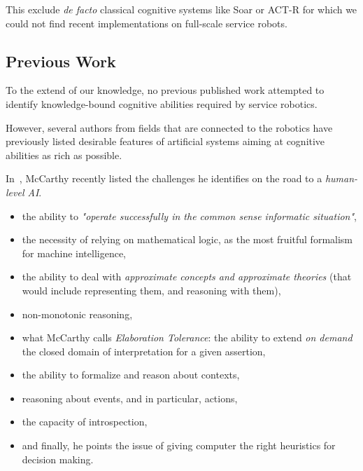 \documentclass[a4paper, twocolumn]{article}
\begin{document}
This exclude \textit{de facto} classical cognitive systems like {\sc Soar} or
{\sc ACT-R} for which we could not find recent implementations on full-scale
service robots.

\subsection{Previous Work}
\label{sect|evaluation-literature}

To the extend of our knowledge, no previous published work attempted to identify
knowledge-bound cognitive abilities required by service robotics.

However, several authors from fields that are connected to the robotics have
previously listed desirable features of artificial systems aiming at cognitive
abilities as rich as possible.

In~\cite{McCarthy2007}, McCarthy recently listed the challenges he identifies
on the road to a \emph{human-level AI}.

\begin{itemize}

	\item the ability to \emph{"operate successfully in the common sense
	informatic situation"},

	\item the necessity of relying on mathematical logic, as the most fruitful
	formalism for machine intelligence,

	\item the ability to deal with \emph{approximate concepts and approximate
	theories} (that would include representing them, and reasoning with them),

	\item non-monotonic reasoning,

	\item what McCarthy calls \emph{Elaboration Tolerance}: the ability to
	extend \emph{on demand} the closed domain of interpretation for a
	given assertion,

	\item the ability to formalize and reason about contexts,

	\item reasoning about events, and in particular, actions,

	\item the capacity of introspection,

	\item and finally, he points the issue of giving computer the right
	heuristics for decision making.

\end{itemize}
\end{document}
